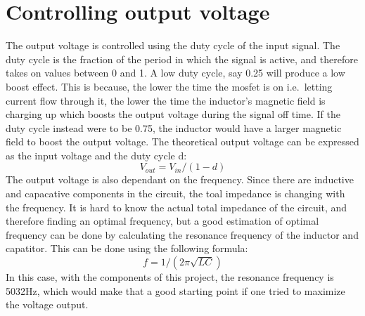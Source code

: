\section{Controlling output voltage}
The output voltage is controlled using the duty cycle of the input signal. The duty cycle is the fraction of the period in which the signal is active, and therefore takes on values between 0 and 1. A low duty cycle, say 0.25 will produce a low boost effect. This is because, the lower the time the mosfet is on i.e.\ letting current flow through it, the lower the time the inductor's magnetic field is charging up which boosts the output voltage during the signal off time. If the duty cycle instead were to be 0.75, the inductor would have a larger magnetic field to boost the output voltage. The theoretical output voltage can be expressed as the input voltage and the duty cycle d:
\begin{equation}
    V_{out}=V_{in}/(1-d)
\end{equation}
The output voltage is also dependant on the frequency. Since there are inductive and capacative components in the circuit, the toal impedance is changing with the frequency. It is hard to know the actual total impedance of the circuit, and therefore finding an optimal frequency, but a good estimation of optimal frequency can be done by calculating the resonance frequency of the inductor and capatitor. This can be done using the following formula:
\begin{equation}
    f=1/(2\pi{}\sqrt{LC})
\end{equation}
In this case, with the components of this project, the resonance frequency is 5032Hz, which would make that a good starting point if one tried to maximize the voltage output.
